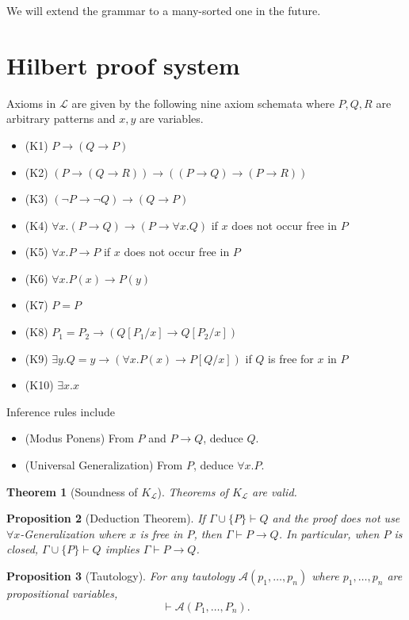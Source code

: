 \documentclass{article}
\newtheorem{thm}{Theorem}
\newtheorem{prop}[thm]{Proposition}
\begin{document}
We will extend the grammar to a many-sorted one in the future.

\section{Hilbert proof system}
Axioms in $\mathcal{L}$ are given by the following nine axiom schemata where $P, Q, R$ are arbitrary patterns and $x, y$ are variables.
\begin{itemize}
\item (K1) $P \to (Q \to P)$
\item (K2) $(P \to (Q \to R)) \to ((P \to Q) \to (P \to R))$
\item (K3) $(\neg P \to \neg Q) \to (Q \to P)$
\item (K4) $\forall x . (P \to Q) \to (P \to \forall x . Q)$ if $x$ does not occur free in $P$
\item (K5) $\forall x . P \to P$ if $x$ does not occur free in $P$
\item (K6) $\forall x . P(x) \to P(y)$
\item (K7) $P = P$
\item (K8) $P_1 = P_2 \to (Q[P_1/x] \to Q[P_2/x])$
\item (K9) $\exists y . Q = y \to (\forall x . P(x) \to P[Q/x])$ if $Q$ is free for $x$ in $P$
\item (K10) $\exists x . x$
\end{itemize}

Inference rules include
\begin{itemize}
\item (Modus Ponens) From $P$ and $P \to Q$, deduce $Q$.
\item (Universal Generalization) From $P$, deduce $\forall x . P$. 
\end{itemize}

\begin{thm}[Soundness of $K_\mathcal{L}$]
Theorems of $K_\mathcal{L}$ are valid.
\end{thm}

\begin{prop}[Deduction Theorem]
If $\Gamma \cup \{P\} \vdash Q$ and the proof does not use \mbox{$\forall x$-Generalization} where $x$ is free in $P$, then $\Gamma \vdash P \to Q$. In particular, when $P$ is closed, $\Gamma \cup \{P\} \vdash Q$ implies $\Gamma \vdash P \to Q$.
\end{prop}

\begin{prop}[Tautology]
For any tautology $\mathcal{A}(p_1,\dots,p_n)$ where $p_1,\dots,p_n$ are propositional variables, $$ \vdash \mathcal{A}(P_1,\dots,P_n).$$
\end{prop}
\end{document}
